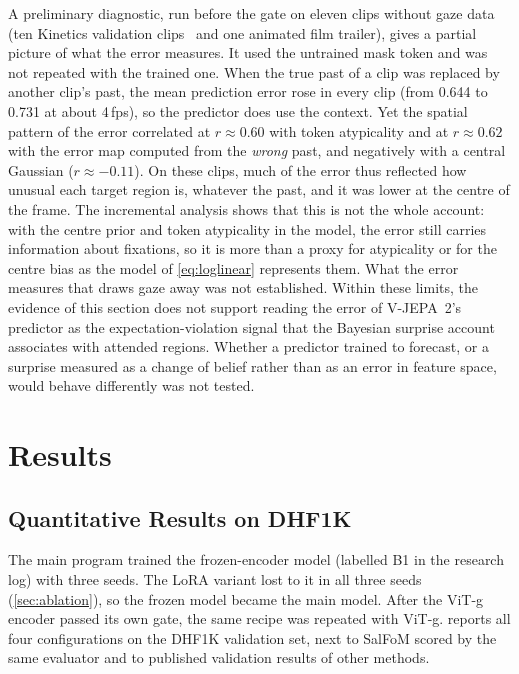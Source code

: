A preliminary diagnostic, run before the gate on eleven clips without gaze data
(ten Kinetics validation clips~\cite{carreira2017quo} and one animated film
trailer), gives a partial picture of what the error measures. It used the
untrained mask token and was not repeated with the trained one. When the true
past of a clip was replaced by another clip's past, the mean prediction error
rose in every clip (from 0.644 to 0.731 at about 4\,fps), so the predictor does
use the context. Yet the spatial pattern of the error correlated at
$r\approx0.60$ with token atypicality and at $r\approx0.62$ with the error map
computed from the \emph{wrong} past, and negatively with a central Gaussian
($r\approx-0.11$). On these clips, much of the error thus reflected how unusual
each target region is, whatever the past, and it was lower at the centre of
the frame. The incremental analysis shows that this is not the whole account:
with the centre prior and token atypicality in the model, the error still
carries information about fixations, so it is more than a proxy for
atypicality or for the centre bias as the model of \cref{eq:loglinear}
represents them. What the error measures that draws gaze away was not
established. Within these limits, the evidence of this section does not support
reading the error of \acrshort{V-JEPA}~2's predictor as the expectation-violation
signal that the Bayesian surprise account~\cite{itti2009bayesian} associates
with attended regions. Whether a predictor trained to forecast, or a surprise
measured as a change of belief rather than as an error in feature space, would
behave differently was not tested.

\section{Results}\label{sec:results}

\subsection{Quantitative Results on DHF1K}\label{sec:main-results}

The main program trained the frozen-encoder model (labelled B1 in the research
log) with three seeds. The \acrshort{LoRA} variant lost to it in all three seeds
(\cref{sec:ablation}), so the frozen model became the main model. After the
\acrshort{ViT}-g encoder passed its own gate, the same recipe was repeated with \acrshort{ViT}-g.
 reports all four configurations on the DHF1K validation set,
next to SalFoM scored by the same evaluator and to published validation results
of other methods.

